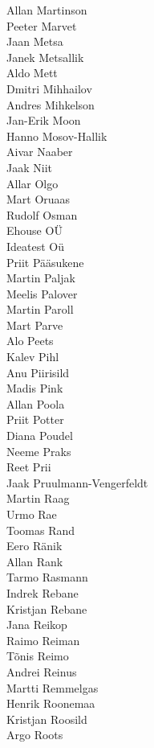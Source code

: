 \begin{multicols}{3}
Allan Martinson\\
Peeter Marvet\\
Jaan Metsa\\
Janek Metsallik\\
Aldo Mett\\
Dmitri Mihhailov\\
Andres Mihkelson\\
Jan-Erik Moon\\
Hanno Mosov-Hallik\\
Aivar Naaber\\
Jaak Niit\\
Allar Olgo\\
Mart Oruaas\\
Rudolf Osman\\
Ehouse OÜ\\
Ideatest Oü\\
Priit Pääsukene\\
Martin Paljak\\
Meelis Palover\\
Martin Paroll\\
Mart Parve\\
Alo Peets\\
Kalev Pihl\\
Anu Piirisild\\
Madis Pink\\
Allan Poola\\
Priit Potter\\
Diana Poudel\\
Neeme Praks\\
Reet Prii\\
Jaak Pruulmann-Vengerfeldt\\
Martin Raag\\
Urmo Rae\\
Toomas Rand\\
Eero Ränik\\
Allan Rank\\
Tarmo Rasmann\\
Indrek Rebane\\
Kristjan Rebane\\
Jana Reikop\\
Raimo Reiman\\
Tõnis Reimo\\
Andrei Reinus\\
Martti Remmelgas\\
Henrik Roonemaa\\
Kristjan Roosild\\
Argo Roots\\

\end{multicols}
